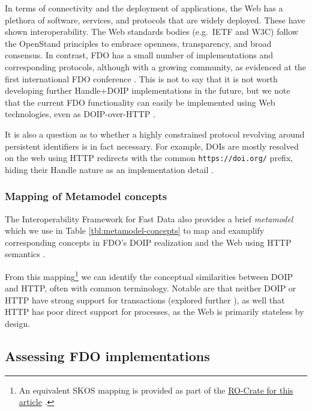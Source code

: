 \documentclass[fleqn,10pt,lineno]{wlpeerjlua}
\begin{document}
In terms of connectivity and the deployment of applications, the Web has a plethora of software, services, and protocols that are widely deployed. These have shown interoperability. The Web standards bodies (e.g.~IETF and W3C) follow the OpenStand principles \autocite{ModernStandardsParadigm} to embrace openness, transparency, and broad consensus. In contrast, FDO has a small number of implementations and corresponding protocols, although with a growing community, as evidenced at the first international FDO conference \autocite{looFirstInternationalConference2022}. This is not to say that it is not worth developing further Handle+DOIP implementations in the future, but we note that the current FDO functionality can easily be implemented using Web technologies, even as DOIP-over-HTTP \autocite{DOIPAPIHTTPa}.

It is also a question as to whether a highly constrained protocol revolving around persistent identifiers is in fact necessary. For example, DOIs are mostly resolved on the web using HTTP redirects with the common \texttt{https://doi.org/} prefix, hiding their Handle nature as an implementation detail \autocite{DOIHandbookResolution}.



\subsubsection*{Mapping of Metamodel concepts}\label{mapping-of-metamodel-concepts}

The Interoperability Framework for Fast Data also provides a brief \emph{metamodel} which we use in Table \vref{tbl:metamodel-concepts} to map and examplify corresponding concepts in FDO's DOIP realization and the Web using HTTP semantics \autocite{rfc9110}. 

From this mapping\footnote{An equivalent SKOS mapping \autocite{w3-skos-primer} is provided as part of the \href{https://w3id.org/ro/doi/10.5281/zenodo.8075229}{RO-Crate for this article} \autocite{stian_soiland_reyes_2023_8075230}.} we can identify the conceptual similarities between DOIP and HTTP, often with common terminology. Notable are that neither DOIP or HTTP have strong support for transactions (explored further ), as well that HTTP has poor direct support for processes, as the Web is primarily stateless by design.



\subsection*{Assessing FDO implementations}\label{sec:doip-fdo-compare}
\end{document}
